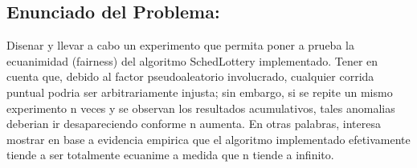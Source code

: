 \subsection{Enunciado del Problema:}

Disenar y llevar a cabo un experimento que permita poner a prueba la ecuanimidad (fairness) del algoritmo SchedLottery implementado. Tener en cuenta que, debido al factor pseudoaleatorio involucrado, cualquier corrida puntual podria ser arbitrariamente injusta; sin embargo, si se repite un mismo experimento n veces y se observan los resultados acumulativos, tales anomalias deberian ir desapareciendo conforme n aumenta. En otras palabras, interesa mostrar en base a evidencia empirica que el algoritmo implementado efetivamente tiende a ser totalmente ecuanime a medida que n tiende a infinito.

